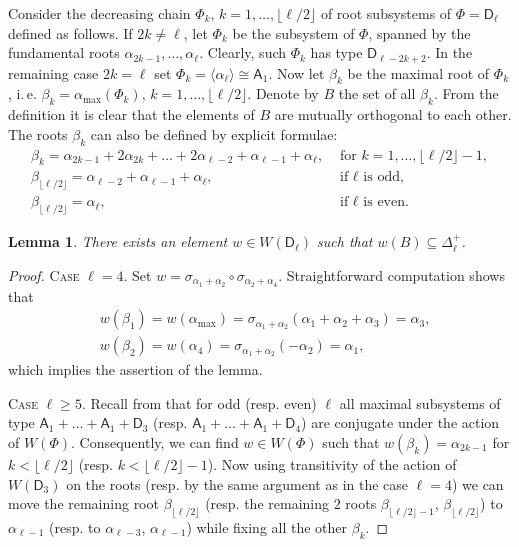 \documentclass[11pt]{amsart}
\theoremstyle{plain}
\numberwithin{equation}{section}
\newtheorem{lemma}{Lemma}
\numberwithin{lemma}{section}
\theoremstyle{definition}
\theoremstyle{remark}
\newcommand{\rA}{\mathsf{A}}
\newcommand{\rD}{\mathsf{D}}
\begin{document}
Consider the decreasing chain $\Phi_k$, $k=1, \ldots, \lfloor \ell/2 \rfloor$ of root subsystems of $\Phi=\rD_\ell$ defined as follows.
If $2k \neq \ell$, let $\Phi_k$ be the subsystem of $\Phi$, spanned by the fundamental roots $\alpha_{2k-1}, \ldots, \alpha_\ell$.
Clearly, such $\Phi_k$ has type $\rD_{\ell-2k+2}$. 
In the remaining case $2k = \ell$ set $\Phi_k = \langle \alpha_\ell \rangle \cong \rA_1$.
Now let $\beta_k$ be the maximal root of $\Phi_k$, i.\,e. $\beta_k = \alpha_{\max}(\Phi_k)$, $k=1, \ldots, \lfloor \ell/2 \rfloor$.
Denote by $B$ the set of all $\beta_k$. From the definition it is clear that the elements of $B$ are mutually orthogonal to each other.
The roots $\beta_k$ can also be defined by explicit formulae:
\begin{align*}
 \beta_k =  \alpha_{2k-1} + 2\alpha_{2k}+ \ldots + 2\alpha_{\ell-2} + \alpha_{\ell-1} + \alpha_\ell, & \text{ for } k=1, \ldots, \lfloor\ell/2\rfloor-1, \\
 \beta_{\lfloor\ell/2\rfloor} = \alpha_{\ell-2}+\alpha_{\ell-1}+\alpha_\ell, & \text{ if $\ell$ is odd, } \\
 \beta_{\lfloor\ell/2\rfloor} = \alpha_\ell, & \text{ if $\ell$ is even.}
\end{align*}

\begin{lemma}\label{lemma:nikolov-weyl} There exists an element $w\in W(\rD_\ell)$ such that $w(B) \subseteq \Delta_\ell^+$. \end{lemma}
\begin{proof}
\textsc{Case $\ell=4$.} Set $w = \sigma_{\alpha_{1} + \alpha_{2}} \circ \sigma_{\alpha_{2} + \alpha_{4}}$.
Straightforward computation shows that 
\begin{align*}
& w(\beta_1) = w(\alpha_{\max}) = \sigma_{\alpha_{1} + \alpha_{2}}(\alpha_1 + \alpha_2 + \alpha_3) = \alpha_3, \\
& w(\beta_2) = w(\alpha_4) = \sigma_{\alpha_{1} + \alpha_{2}}(- \alpha_2) = \alpha_1,
\end{align*}
which implies the assertion of the lemma.

\textsc{Case $\ell \geq 5$.}
Recall from \cite[Table~9]{Dy72} that for odd (resp. even) $\ell$ all maximal subsystems of type $\rA_1+\ldots+\rA_1+\rD_3$
(resp. $\rA_1+\ldots+\rA_1+\rD_4$) are conjugate under the action of $W(\Phi)$. Consequently, we can find $w\in W(\Phi)$
such that $w(\beta_k) = \alpha_{2k-1}$ for $k < \lfloor\ell/2\rfloor$ (resp. $k < \lfloor\ell/2\rfloor-1$). 
Now using transitivity of the action of $W(\rD_3)$ on the roots (resp. by the same argument as in the case $\ell=4$) we can move the remaining root $\beta_{\lfloor\ell/2\rfloor}$ 
(resp. the remaining $2$ roots $\beta_{\lfloor\ell/2\rfloor-1}$, $\beta_{\lfloor\ell/2\rfloor}$) to
$\alpha_{\ell-1}$ (resp. to $\alpha_{\ell-3}$, $\alpha_{\ell-1}$) while fixing all the other $\beta_k$. \end{proof}
\end{document}
